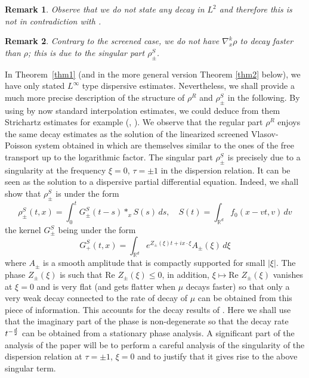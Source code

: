 \documentclass[11pt]{amsart}
\numberwithin{equation}{section}
\newcommand{\na}{\nabla}
\newtheorem{rem}{Remark}[section]
\begin{document}
\begin{rem}
Observe that we do not state any decay in $L^2$ and therefore this is not in contradiction with \cite{GS1,GS2}.
\end{rem}

\begin{rem}
Contrary to the screened case, we do not have $\na_x^k \rho$ to decay faster than $\rho$; this is due to the singular part $\rho^S_\pm$.
\end{rem}

In Theorem~\ref{thm1} (and in  the more general version Theorem \ref{thm2} below), we have only stated $L^\infty$ type dispersive estimates. Nevertheless, we shall provide
 a much more precise description  of the structure of $\rho^{R}$ and $\rho^S_{\pm}$ in the following.
  By using  by now standard interpolation estimates, we could  deduce from them Strichartz estimates for example (\cite{Castella-Perthame}, \cite{Ginibre-Velo}).
  We observe that the regular part $\rho^{R}$ enjoys the same decay estimates as the solution of the linearized screened
  Vlasov-Poisson system obtained in \cite{HNR} which are themselves similar to the ones of the free transport up to the logarithmic factor. The singular part $\rho^S_{\pm}$ is precisely due to  a singularity at the frequency  
   $\xi= 0$, $\tau = \pm1$ in the dispersion relation. It can be seen as the solution to a dispersive  partial differential equation.
    Indeed, we shall show that $\rho^{S}_{\pm}$ is under the form
    $$   \rho^{S}_{\pm} (t,x)= \int_{0}^t G_{\pm}^S(t-s) *_{x} S(s)\, ds, \quad S(t)= \int_{\mathbb{R}^d} f_{0}(x-vt, v)\, dv$$
    the kernel $G_{\pm}^S$ being under the form
    $$  G^S_{+}(t,x) = \int_{\mathbb{R}^d} e^{Z_{\pm}(\xi) t + i x \cdot \xi} A_{\pm}(\xi) \, 
    d \xi$$
    where $ A_{\pm}$ is a smooth amplitude that is compactly supported for small $|\xi|$. The phase $Z_{\pm}(\xi)$ is such that $ \mbox{Re } Z_{\pm}(\xi) \leq 0$, 
    in addition,  $ \xi \mapsto \mbox{Re } Z_{\pm}(\xi)$ vanishes at $\xi=0$ and  is very flat  (and gets  flatter  when $\mu$ decays faster) so that only a very weak decay connected to the rate of decay of $\mu$  can be obtained
     from this piece of information. This accounts for the decay results of \cite{GS1,GS2}. %
     Here we shall use that the imaginary part of the phase
      is non-degenerate so that  the decay rate $t^{- {d \over 2}}$ can be obtained from a stationary phase analysis.
       A significant part of the analysis of the paper  will be to perform a careful analysis of the  singularity of the dispersion relation at $\tau= \pm1$, $\xi= 0$
     and to justify that it  gives rise to the above singular term.
      
\end{document}
